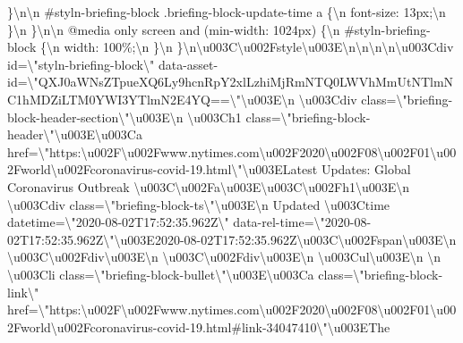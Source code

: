 \}\textbackslash{}n\textbackslash{}n \#styln-briefing-block
.briefing-block-update-time a \{\textbackslash{}n font-size:
13px;\textbackslash{}n \}\textbackslash{}n
\}\textbackslash{}n\textbackslash{}n @media only screen and (min-width:
1024px) \{\textbackslash{}n \#styln-briefing-block \{\textbackslash{}n
width: 100\%;\textbackslash{}n \}\textbackslash{}n
\}\textbackslash{}n\textbackslash{}u003C\textbackslash{}u002Fstyle\textbackslash{}u003E\textbackslash{}n\textbackslash{}n\textbackslash{}n\textbackslash{}n\textbackslash{}u003Cdiv
id=\textbackslash{}"styln-briefing-block\textbackslash{}"
data-asset-id=\textbackslash{}"QXJ0aWNsZTpueXQ6Ly9hcnRpY2xlLzhiMjRmNTQ0LWVhMmUtNTlmNC1hMDZiLTM0YWI3YTlmN2E4YQ==\textbackslash{}"\textbackslash{}u003E\textbackslash{}n
\textbackslash{}u003Cdiv
class=\textbackslash{}"briefing-block-header-section\textbackslash{}"\textbackslash{}u003E\textbackslash{}n
\textbackslash{}u003Ch1
class=\textbackslash{}"briefing-block-header\textbackslash{}"\textbackslash{}u003E\textbackslash{}u003Ca
href=\textbackslash{}"https:\textbackslash{}u002F\textbackslash{}u002Fwww.nytimes.com\textbackslash{}u002F2020\textbackslash{}u002F08\textbackslash{}u002F01\textbackslash{}u002Fworld\textbackslash{}u002Fcoronavirus-covid-19.html\textbackslash{}"\textbackslash{}u003ELatest
Updates: Global Coronavirus Outbreak
\textbackslash{}u003C\textbackslash{}u002Fa\textbackslash{}u003E\textbackslash{}u003C\textbackslash{}u002Fh1\textbackslash{}u003E\textbackslash{}n
\textbackslash{}u003Cdiv
class=\textbackslash{}"briefing-block-ts\textbackslash{}"\textbackslash{}u003E\textbackslash{}n
Updated \textbackslash{}u003Ctime
datetime=\textbackslash{}"2020-08-02T17:52:35.962Z\textbackslash{}"
data-rel-time=\textbackslash{}"2020-08-02T17:52:35.962Z\textbackslash{}"\textbackslash{}u003E2020-08-02T17:52:35.962Z\textbackslash{}u003C\textbackslash{}u002Fspan\textbackslash{}u003E\textbackslash{}n
\textbackslash{}u003C\textbackslash{}u002Fdiv\textbackslash{}u003E\textbackslash{}n
\textbackslash{}u003C\textbackslash{}u002Fdiv\textbackslash{}u003E\textbackslash{}n
\textbackslash{}u003Cul\textbackslash{}u003E\textbackslash{}n
\textbackslash{}n \textbackslash{}u003Cli
class=\textbackslash{}"briefing-block-bullet\textbackslash{}"\textbackslash{}u003E\textbackslash{}u003Ca
class=\textbackslash{}"briefing-block-link\textbackslash{}"
href=\textbackslash{}"https:\textbackslash{}u002F\textbackslash{}u002Fwww.nytimes.com\textbackslash{}u002F2020\textbackslash{}u002F08\textbackslash{}u002F01\textbackslash{}u002Fworld\textbackslash{}u002Fcoronavirus-covid-19.html\#link-34047410\textbackslash{}"\textbackslash{}u003EThe

